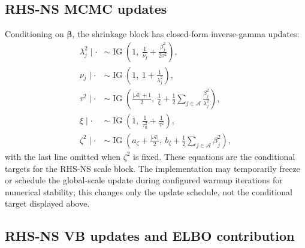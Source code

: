 \documentclass[nojss,noheadings]{jss}
\newcommand{\vect}[1]{\bm{#1}}
\newcommand{\IG}{\operatorname{IG}}
\begin{document}
\subsection{RHS-NS MCMC updates}

Conditioning on $\vect{\beta}$, the shrinkage block has closed-form
inverse-gamma updates:
\begin{align}
\lambda_j^2\mid\cdot
&\sim
\IG\left(1,\ \frac{1}{\nu_j}+\frac{\beta_j^2}{2\tau^2}\right),\\
\nu_j\mid\cdot
&\sim
\IG\left(1,\ 1+\frac{1}{\lambda_j^2}\right),\\
\tau^2\mid\cdot
&\sim
\IG\left(\frac{|\mathcal{A}|+1}{2},\
\frac{1}{\xi}+\frac{1}{2}\sum_{j\in\mathcal{A}}\frac{\beta_j^2}{\lambda_j^2}
\right),\\
\xi\mid\cdot
&\sim
\IG\left(1,\ \frac{1}{\tau_0^2}+\frac{1}{\tau^2}\right),\\
\zeta^2\mid\cdot
&\sim
\IG\left(a_\zeta+\frac{|\mathcal{A}|}{2},\
b_\zeta+\frac{1}{2}\sum_{j\in\mathcal{A}}\beta_j^2
\right),
\label{eq:rhs_ns_mcmc}
\end{align}
with the last line omitted when $\zeta^2$ is fixed.
These equations are the conditional targets for the RHS-NS scale block. The
implementation may temporarily freeze or schedule the global-scale update during
configured warmup iterations for numerical stability; this changes only the
update schedule, not the conditional target displayed above.

\subsection{RHS-NS VB updates and ELBO contribution}
\end{document}

